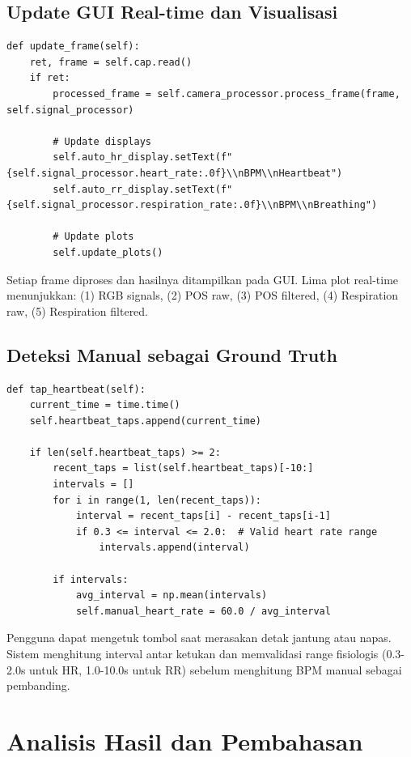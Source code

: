 \documentclass[11pt,a4paper]{article}
\begin{document}
\subsection{Update GUI Real-time dan Visualisasi}
    \begin{lstlisting}
def update_frame(self):
    ret, frame = self.cap.read()
    if ret:
        processed_frame = self.camera_processor.process_frame(frame, self.signal_processor)
        
        # Update displays
        self.auto_hr_display.setText(f"{self.signal_processor.heart_rate:.0f}\\nBPM\\nHeartbeat")
        self.auto_rr_display.setText(f"{self.signal_processor.respiration_rate:.0f}\\nBPM\\nBreathing")
        
        # Update plots
        self.update_plots()
    \end{lstlisting}
    Setiap frame diproses dan hasilnya ditampilkan pada GUI. Lima plot real-time menunjukkan: (1) RGB signals, (2) POS raw, (3) POS filtered, (4) Respiration raw, (5) Respiration filtered.

\subsection{Deteksi Manual sebagai Ground Truth}
    \begin{lstlisting}
def tap_heartbeat(self):
    current_time = time.time()
    self.heartbeat_taps.append(current_time)
    
    if len(self.heartbeat_taps) >= 2:
        recent_taps = list(self.heartbeat_taps)[-10:]
        intervals = []
        for i in range(1, len(recent_taps)):
            interval = recent_taps[i] - recent_taps[i-1]
            if 0.3 <= interval <= 2.0:  # Valid heart rate range
                intervals.append(interval)
        
        if intervals:
            avg_interval = np.mean(intervals)
            self.manual_heart_rate = 60.0 / avg_interval
    \end{lstlisting}
    Pengguna dapat mengetuk tombol saat merasakan detak jantung atau napas. Sistem menghitung interval antar ketukan dan memvalidasi range fisiologis (0.3-2.0s untuk HR, 1.0-10.0s untuk RR) sebelum menghitung BPM manual sebagai pembanding.

\section{Analisis Hasil dan Pembahasan}
\end{document}
